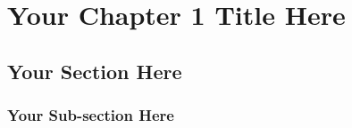 \label{03.labreport1}
\chapter{Your Chapter 1 Title Here}
\section{Your Section Here}
\subsection{Your Sub-section Here}